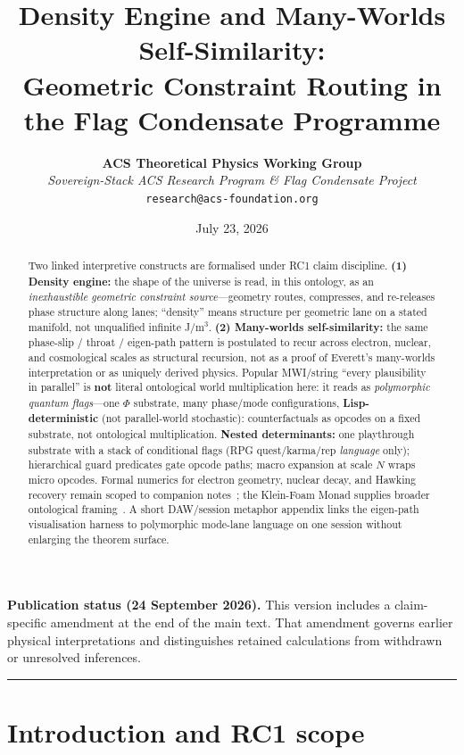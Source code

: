 \documentclass[11pt,a4paper]{article}
\title{\LARGE\bfseries Density Engine and Many-Worlds Self-Similarity:\\
Geometric Constraint Routing in the Flag Condensate Programme}
\author{\textbf{ACS Theoretical Physics Working Group}\\[0.3em]
\small\textit{Sovereign-Stack ACS Research Program \& Flag Condensate Project}\\
\small\texttt{research@acs-foundation.org}}
\date{July 23, 2026}
\theoremstyle{remark}
\theoremstyle{definition}
\begin{document}
\maketitle

\begin{abstract}
Two linked interpretive constructs are formalised under RC1 claim discipline.
\textbf{(1) Density engine:} the shape of the universe is read, in this ontology,
as an \emph{inexhaustible geometric constraint source}---geometry routes,
compresses, and re-releases phase structure along lanes; ``density'' means
structure per geometric lane on a stated manifold, not unqualified infinite
J/m$^3$.  \textbf{(2) Many-worlds self-similarity:} the same phase-slip /
throat / eigen-path pattern is postulated to recur across electron, nuclear,
and cosmological scales as structural recursion, not as a proof of Everett's
many-worlds interpretation or as uniquely derived physics.  Popular MWI/string
``every plausibility in parallel'' is \textbf{not} literal ontological world
multiplication here: it reads as \emph{polymorphic quantum flags}---one
$\Phi$ substrate, many phase/mode configurations, \textbf{Lisp-deterministic}
(not parallel-world stochastic): counterfactuals as opcodes on a fixed
substrate, not ontological multiplication.  \textbf{Nested determinants:}
one playthrough substrate with a stack of conditional flags (RPG quest/karma/rep
\emph{language} only); hierarchical guard predicates gate opcode paths; macro
expansion at scale $N$ wraps micro opcodes.  Formal numerics
for electron geometry, nuclear decay, and Hawking recovery remain scoped to
companion notes~\cite{Mobius2026,FlagDecay2026,PalphaRefined2026}; the Klein-Foam
Monad supplies broader ontological framing~\cite{KFM2026}.  A short DAW/session
metaphor appendix links the eigen-path visualisation harness to polymorphic
mode-lane language on one session without enlarging the theorem surface.
\end{abstract}
\par\smallskip\noindent\textbf{Publication status (24 September 2026).}
This version includes a claim-specific amendment at the end of the main text.
That amendment governs earlier physical interpretations and distinguishes
retained calculations from withdrawn or unresolved inferences.\par\smallskip


\vspace{0.1em}
\hrule
\vspace{0.4em}

\section{Introduction and RC1 scope}
\label{sec:intro}
\end{document}
